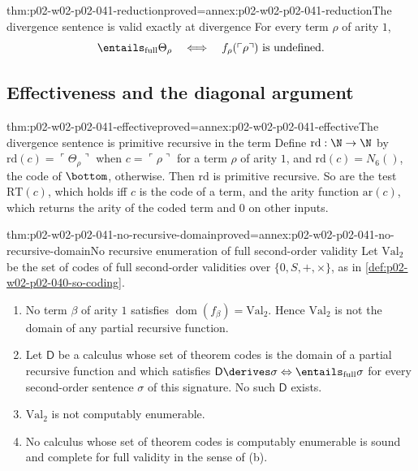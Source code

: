 \begin{hbtheorem}{thm:p02-w02-p02-041-reduction}{proved=annex:p02-w02-p02-041-reduction}{The divergence sentence is valid exactly at divergence}
For every term \(\rho\) of arity \(1\),
\[
 \entails_{\mathrm{full}}\Theta_\rho
 \quad\Longleftrightarrow\quad
 f_\rho(\ulcorner\rho\urcorner)\text{ is undefined}.
\]
\end{hbtheorem}

\subsection{Effectiveness and the diagonal argument}
\label{sec:p02-w02-p02-041-diagonal}

\begin{hblemma}{thm:p02-w02-p02-041-effective}{proved=annex:p02-w02-p02-041-effective}{The divergence sentence is primitive recursive in the term}
Define \(\mathrm{rd}:\N\to\N\) by
\(\mathrm{rd}(c)=\ulcorner\Theta_\rho\urcorner\) when \(c=\ulcorner\rho\urcorner\)
for a term \(\rho\) of arity \(1\), and \(\mathrm{rd}(c)=N_6()\), the code of
\(\bottom\), otherwise.  Then \(\mathrm{rd}\) is primitive recursive.  So
are the test \(\mathrm{RT}(c)\), which holds iff \(c\) is the code of a
term, and the arity function \(\mathrm{ar}(c)\), which returns the arity of the
coded term and \(0\) on other inputs.
\end{hblemma}

\begin{hbtheorem}{thm:p02-w02-p02-041-no-recursive-domain}{proved=annex:p02-w02-p02-041-no-recursive-domain}{No recursive enumeration of full second-order validity}
Let \(\mathrm{Val}_2\) be the set of codes of full second-order validities over
\(\{0,S,+,\times\}\), as in \cref{def:p02-w02-p02-040-so-coding}.
\begin{enumerate}
 \item[(a)] No term \(\beta\) of arity \(1\) satisfies
   \(\operatorname{dom}(f_\beta)=\mathrm{Val}_2\).  Hence
   \(\mathrm{Val}_2\) is not the domain of any partial recursive function.
 \item[(b)] Let \(\mathsf D\) be a calculus whose set of theorem codes is the
   domain of a partial recursive function and which satisfies
   \(\mathsf D\derives\sigma\Leftrightarrow\entails_{\mathrm{full}}\sigma\) for every
   second-order sentence \(\sigma\) of this signature.  No such \(\mathsf D\)
   exists.
 \item[(c)] \(\mathrm{Val}_2\) is not computably enumerable.
 \item[(d)] No calculus whose set of theorem codes is computably enumerable is
   sound and complete for full validity in the sense of (b).
\end{enumerate}
\end{hbtheorem}

